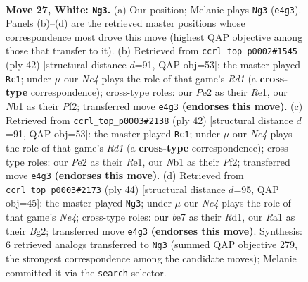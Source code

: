 \documentclass[11pt]{article}
\begin{document}
\clearpage

\begin{figure}[p]\centering
\begin{subfigure}{0.46\textwidth}\centering
\resizebox{\linewidth}{!}{%
\newchessgame
\chessboard[
  setfen={r1b2rk1/p2nb2p/8/2pq4/Pp1pNP2/1P6/2Q1PK2/RNBR4 w - - 0 27},
  showmover=false,
  pgfstyle=straightmove, color=movearrow, markmove={e4-g3}
]}
\caption{}
\end{subfigure}\hfill
\begin{subfigure}{0.46\textwidth}\centering
\resizebox{\linewidth}{!}{%
\newchessgame
\chessboard[
  setfen={2kr4/pbq2p2/n3p3/2p5/PpprN2P/6P1/1P2QPB1/3RR1K1 w - - 4 22},
  showmover=false,
  pgfstyle=straightmove, color=movearrow, markmove={d1-c1}
]}
\caption{}
\end{subfigure}
\\[4pt]
\begin{subfigure}{0.46\textwidth}\centering
\resizebox{\linewidth}{!}{%
\newchessgame
\chessboard[
  setfen={2kr4/pbq2p2/n3p3/2p5/PpprN2P/6P1/1P2QPB1/3RR1K1 w - - 4 22},
  showmover=false,
  pgfstyle=straightmove, color=movearrow, markmove={d1-c1}
]}
\caption{}
\end{subfigure}\hfill
\begin{subfigure}{0.46\textwidth}\centering
\resizebox{\linewidth}{!}{%
\newchessgame
\chessboard[
  setfen={5rk1/r2n1p2/5bpp/p2Ppq2/1pQ1N3/4P3/1P3PBP/R2R2K1 w - - 1 23},
  showmover=false,
  pgfstyle=straightmove, color=movearrow, markmove={e4-g3}
]}
\caption{}
\end{subfigure}
\caption{\textbf{Move 27, White: \texttt{Ng3}.} (a) Our position; Melanie plays \texttt{Ng3} (\texttt{e4g3}). Panels (b)--(d) are the retrieved master positions whose correspondence most drove this move (highest QAP objective among those that transfer to it). (b) Retrieved from \texttt{ccrl\_top\_p0002\#1545} (ply 42) [structural distance $d$=91, QAP obj=53]: the master played \texttt{Rc1}; under $\mu$ our \emph{Ne4} plays the role of that game's \emph{Rd1} (a \textbf{cross-type} correspondence); cross-type roles: our \emph{P}e2 as their \emph{R}e1, our \emph{N}b1 as their \emph{P}f2; transferred move \texttt{e4g3} \textbf{(endorses this move)}. (c) Retrieved from \texttt{ccrl\_top\_p0003\#2138} (ply 42) [structural distance $d$=91, QAP obj=53]: the master played \texttt{Rc1}; under $\mu$ our \emph{Ne4} plays the role of that game's \emph{Rd1} (a \textbf{cross-type} correspondence); cross-type roles: our \emph{P}e2 as their \emph{R}e1, our \emph{N}b1 as their \emph{P}f2; transferred move \texttt{e4g3} \textbf{(endorses this move)}. (d) Retrieved from \texttt{ccrl\_top\_p0003\#2173} (ply 44) [structural distance $d$=95, QAP obj=45]: the master played \texttt{Ng3}; under $\mu$ our \emph{Ne4} plays the role of that game's \emph{Ne4}; cross-type roles: our \emph{b}e7 as their \emph{R}d1, our \emph{R}a1 as their \emph{B}g2; transferred move \texttt{e4g3} \textbf{(endorses this move)}. Synthesis: 6 retrieved analogs transferred to \texttt{Ng3} (summed QAP objective 279, the strongest correspondence among the candidate moves); Melanie committed it via the \texttt{search} selector.}
\label{fig:thought-m52}
\end{figure}
\end{document}
